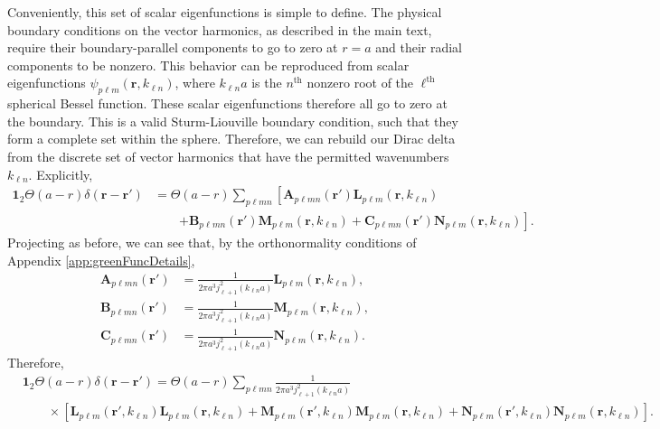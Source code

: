 \documentclass{article}
\begin{document}
Conveniently, this set of scalar eigenfunctions is simple to define. The physical boundary conditions on the vector harmonics, as described in the main text, require their boundary-parallel components to go to zero at $r = a$ and their radial components to be nonzero. This behavior can be reproduced from scalar eigenfunctions $\psi_{p\ell m}(\mathbf{r},k_{\ell n})$, where $k_{\ell n}a$ is the $n^\mathrm{th}$ nonzero root of the $\ell^\mathrm{th}$ spherical Bessel function. These scalar eigenfunctions therefore all go to zero at the boundary. This is a valid Sturm-Liouville boundary condition, such that they form a complete set within the sphere. Therefore, we can rebuild our Dirac delta from the discrete set of vector harmonics that have the permitted wavenumbers $k_{\ell n}$. Explicitly,
\begin{equation}
\begin{split}
\bm{1}_2\Theta(a - r)\delta(\mathbf{r} - \mathbf{r}') &= \Theta(a - r)\sum_{p\ell m n}\left[\mathbf{A}_{p\ell mn}(\mathbf{r}')\mathbf{L}_{p\ell m}(\mathbf{r},k_{\ell n})\right.\\
&\qquad\left. + \mathbf{B}_{p\ell mn}(\mathbf{r}')\mathbf{M}_{p\ell m}(\mathbf{r},k_{\ell n}) + \mathbf{C}_{p\ell mn}(\mathbf{r}')\mathbf{N}_{p\ell m}(\mathbf{r},k_{\ell n})\right].
\end{split}
\end{equation}
Projecting as before, we can see that, by the orthonormality conditions of Appendix \ref{app:greenFuncDetails},
\begin{equation}
\begin{split}
\mathbf{A}_{p\ell mn}(\mathbf{r}') &= \frac{1}{2\pi a^3j_{\ell + 1}^2(k_{\ell n}a)}\mathbf{L}_{p\ell m}(\mathbf{r},k_{\ell n}),\\
\mathbf{B}_{p\ell mn}(\mathbf{r}') &= \frac{1}{2\pi a^3j_{\ell + 1}^2(k_{\ell n}a)}\mathbf{M}_{p\ell m}(\mathbf{r},k_{\ell n}),\\
\mathbf{C}_{p\ell mn}(\mathbf{r}') &= \frac{1}{2\pi a^3j_{\ell + 1}^2(k_{\ell n}a)}\mathbf{N}_{p\ell m}(\mathbf{r},k_{\ell n}).
\end{split}
\end{equation}
Therefore,
\begin{equation}
\begin{split}
&\bm{1}_2\Theta(a - r)\delta(\mathbf{r} - \mathbf{r}') = \Theta(a - r)\sum_{p\ell m n}\frac{1}{2\pi a^3j_{\ell + 1}^2(k_{\ell n}a)}\\
&\qquad\times\left[\mathbf{L}_{p\ell m}(\mathbf{r}',k_{\ell n})\mathbf{L}_{p\ell m}(\mathbf{r},k_{\ell n}) + \mathbf{M}_{p\ell m}(\mathbf{r}',k_{\ell n})\mathbf{M}_{p\ell m}(\mathbf{r},k_{\ell n}) + \mathbf{N}_{p\ell m}(\mathbf{r}',k_{\ell n})\mathbf{N}_{p\ell m}(\mathbf{r},k_{\ell n})\right].
\end{split}
\end{equation}
\end{document}
